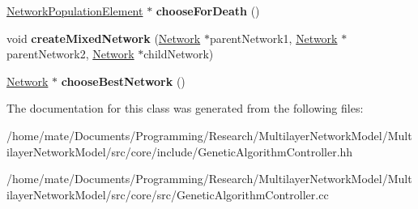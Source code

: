 \begin{DoxyCompactItemize}
\item 
\hyperlink{classNetworkPopulationElement}{Network\+Population\+Element} $\ast$ {\bfseries choose\+For\+Death} ()\hypertarget{classGeneticAlgorithmController_a350ec79a28d1d1009384eacf93bc0171}{}\label{classGeneticAlgorithmController_a350ec79a28d1d1009384eacf93bc0171}

\item 
void {\bfseries create\+Mixed\+Network} (\hyperlink{classNetwork}{Network} $\ast$parent\+Network1, \hyperlink{classNetwork}{Network} $\ast$parent\+Network2, \hyperlink{classNetwork}{Network} $\ast$child\+Network)\hypertarget{classGeneticAlgorithmController_a92ca74b0e18054383292745bb2f72f7b}{}\label{classGeneticAlgorithmController_a92ca74b0e18054383292745bb2f72f7b}

\item 
\hyperlink{classNetwork}{Network} $\ast$ {\bfseries choose\+Best\+Network} ()\hypertarget{classGeneticAlgorithmController_a334b1eaff6e53bf69336e8fb98d88bab}{}\label{classGeneticAlgorithmController_a334b1eaff6e53bf69336e8fb98d88bab}

\end{DoxyCompactItemize}


The documentation for this class was generated from the following files\+:\begin{DoxyCompactItemize}
\item 
/home/mate/\+Documents/\+Programming/\+Research/\+Multilayer\+Network\+Model/\+Multilayer\+Network\+Model/src/core/include/Genetic\+Algorithm\+Controller.\+hh\item 
/home/mate/\+Documents/\+Programming/\+Research/\+Multilayer\+Network\+Model/\+Multilayer\+Network\+Model/src/core/src/Genetic\+Algorithm\+Controller.\+cc\end{DoxyCompactItemize}
